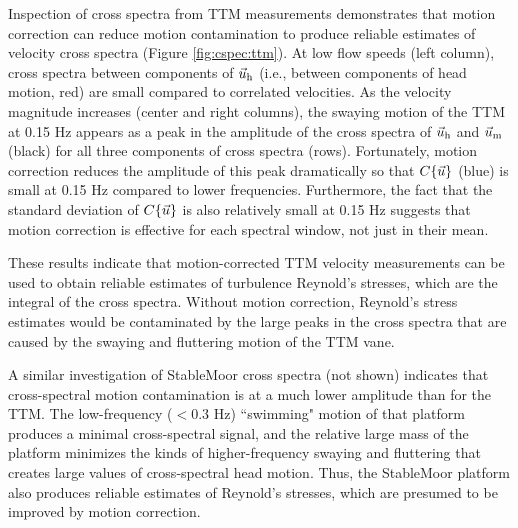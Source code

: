 Inspection of cross spectra from TTM measurements demonstrates that motion correction can reduce motion contamination to produce reliable estimates of velocity cross spectra (Figure \ref{fig:cspec:ttm}). At low flow speeds (left column), cross spectra between components of $\vec{u}_\mathrm{h}$ (i.e., between components of head motion, red) are small compared to correlated velocities. As the velocity magnitude increases (center and right columns), the swaying motion of the TTM at 0.15 Hz appears as a peak in the amplitude of the cross spectra of $\vec{u}_\mathrm{h}$ and $\vec{u}_\mathrm{m}$ (black) for all three components of cross spectra (rows). Fortunately, motion correction reduces the amplitude of this peak dramatically so that $C\{\vec{u}\}$ (blue) is small at 0.15 Hz compared to lower frequencies. Furthermore, the fact that the standard deviation of $C\{\vec{u}\}$ is also relatively small at 0.15 Hz suggests that motion correction is effective for each spectral window, not just in their mean.

These results indicate that motion-corrected TTM velocity measurements can be used to obtain reliable estimates of turbulence Reynold's stresses, which are the integral of the cross spectra. Without motion correction, Reynold's stress estimates would be contaminated by the large peaks in the cross spectra that are caused by the swaying and fluttering motion of the TTM vane.

A similar investigation of StableMoor cross spectra (not shown) indicates that cross-spectral motion contamination is at a much lower amplitude than for the TTM. The low-frequency ($<0.3$ Hz) ``swimming" motion of that platform produces a minimal cross-spectral signal, and the relative large mass of the platform minimizes the kinds of higher-frequency swaying and fluttering that creates large values of cross-spectral head motion. Thus, the StableMoor platform also produces reliable estimates of Reynold's stresses, which are presumed to be improved by motion correction.





